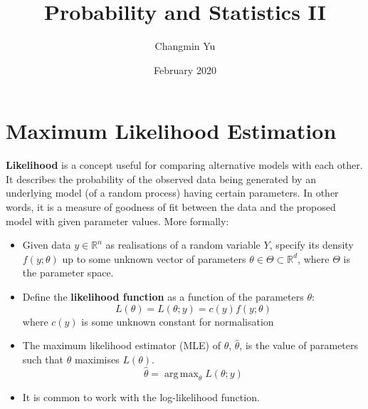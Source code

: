 \documentclass{article}
\title{Probability and Statistics II}
\author{Changmin Yu}
\date{February 2020}
\DeclareMathOperator*{\argmax}{arg\,max}
\begin{document}
\maketitle
\section{Maximum Likelihood Estimation}
\textbf{Likelihood} is a concept useful for comparing alternative models with each other. It describes the probability of the observed data being generated by an underlying model (of a random process) having certain parameters. In other words, it is a measure of goodness of fit between the data and the proposed model with given parameter values. More formally:
\begin{itemize}
    \item Given data $y\in\mathbb{R}^n$ as realisations of a random variable $Y$, specify its density $f(y; \theta)$ up to some unknown vector of parameters $\theta \in \Theta \subset \mathbb{R}^d$, where $\Theta$ is the parameter space.
    \item Define the \textbf{likelihood function} as a function of the parameters $\theta$:
    \begin{equation}
        L(\theta) = L(\theta; y) = c(y)f(y; \theta)
    \end{equation}
    where $c(y)$ is some unknown constant for normalisation
    \item The maximum likelihood estimator (MLE) of $\theta$, $\hat{\theta}$, is the value of parameters such that $\hat{\theta}$ maximises $L(\theta)$.
    \begin{equation}
        \hat{\theta} = \argmax_{\theta}L(\theta; y)
    \end{equation}
    \item It is common to work with the log-likelihood function.
\end{itemize}
\end{document}
